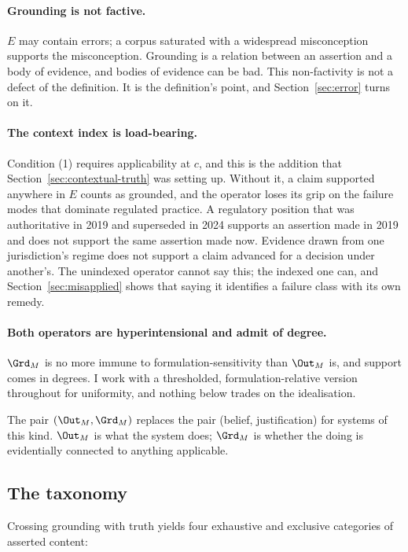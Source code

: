\paragraph{Grounding is not factive.} $E$ may contain errors; a corpus saturated
with a widespread misconception supports the misconception. Grounding is a
relation between an assertion and a body of evidence, and bodies of evidence can
be bad. This non-factivity is not a defect of the definition. It is the
definition's point, and Section~\ref{sec:error} turns on it.

\paragraph{The context index is load-bearing.} Condition (1) requires
applicability at $c$, and this is the addition that
Section~\ref{sec:contextual-truth} was setting up. Without it, a claim supported
anywhere in $E$ counts as grounded, and the operator loses its grip on the
failure modes that dominate regulated practice. A regulatory position that was
authoritative in 2019 and superseded in 2024 supports an assertion made in 2019
and does not support the same assertion made now. Evidence drawn from one
jurisdiction's regime does not support a claim advanced for a decision under
another's. The unindexed operator cannot say this; the indexed one can, and
Section~\ref{sec:misapplied} shows that saying it identifies a failure class with
its own remedy.

\paragraph{Both operators are hyperintensional and admit of degree.} $\Grd_M$ is
no more immune to formulation-sensitivity than $\Out_M$ is, and support comes in
degrees. I work with a thresholded, formulation-relative version throughout for
uniformity, and nothing below trades on the idealisation.

The pair $(\Out_M, \Grd_M)$ replaces the pair (belief, justification) for systems
of this kind. $\Out_M$ is what the system does; $\Grd_M$ is whether the doing is
evidentially connected to anything applicable.

\subsection{The taxonomy}
\label{sec:taxonomy}

Crossing grounding with truth yields four exhaustive and exclusive categories of
asserted content:

